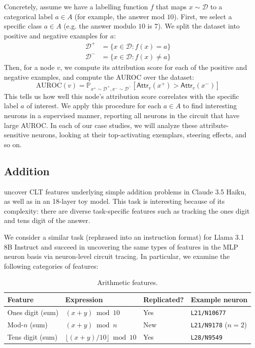 \documentclass{article}
\theoremstyle{plain}
\theoremstyle{definition}
\theoremstyle{remark}
\begin{document}
Concretely, assume we have a labelling function $f$ that maps $x \sim \mathcal{D}$ to a categorical label $a \in A$ (for example, the answer mod $10$). First, we select a specific class $a \in A$ (e.g. the answer modulo $10$ is $7$). We split the dataset into positive and negative examples for $a$:
\begin{align}
\mathcal{D}^+ &= \{x \in \mathcal{D} : f(x) = a\} \\
\mathcal{D}^- &= \{x \in \mathcal{D} : f(x) \neq a\}
\end{align}
Then, for a node $v$, we compute its attribution score for each of the positive and negative examples, and compute the AUROC over the dataset:
\begin{equation}
\mathrm{AUROC}(v) = \mathbb{P}_{x^+ \sim \mathcal{D}^+, x^- \sim \mathcal{D}^-}[\mathsf{Attr}_v(x^+) > \mathsf{Attr}_v(x^-)]
\end{equation}
This tells us how well this node's attribution score correlates with the specific label $a$ of interest. We apply this procedure for each $a \in A$ to find interesting neurons in a supervised manner, reporting all neurons in the circuit that have large AUROC. In each of our case studies,
we will analyze these attribute-sensitive neurons, looking at their top-activating exemplars, steering effects, and so on.

\newpage
\subsection{Addition}

\citet{ameisen2025circuit} uncover CLT features underlying simple addition problems in Claude 3.5 Haiku, as well as in an 18-layer toy model. This task is interesting because of its complexity: there are diverse task-specific features such as tracking the ones digit and tens digit of the answer.

We consider a similar task (rephrased into an instruction format) for Llama 3.1 8B Instruct and succeed in uncovering the same types of features in the MLP neuron basis via neuron-level circuit tracing.
In particular, we examine the following categories of features:

\begin{table}[!h]
\small
\centering
\caption{Arithmetic features.}
\begin{tabular}{llll}
\toprule
\textbf{Feature} & \textbf{Expression} & \textbf{Replicated?} & \textbf{Example neuron} \\
\midrule
Ones digit (sum) & $(x + y) \bmod 10$ & Yes & \texttt{L21/N10677} \\
Mod-$n$ (sum) & $(x + y) \bmod n$ & New & \texttt{L21/N9178} ($n=2$) \\
Tens digit (sum) & $\lfloor (x + y) / 10 \rfloor \bmod 10$ & Yes & \texttt{L28/N9549} \\
\bottomrule
\end{tabular}
\label{tab:arithmetic_features}
\end{table}
\end{document}
